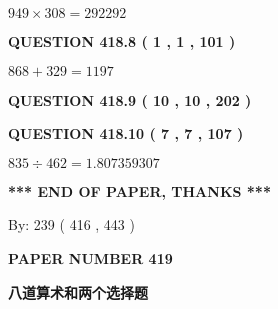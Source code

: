 \documentclass{ctexart}
\begin{document}
  
 
 

$ %
949 \times  %
308=   %
292292$
 
 
  
\vspace{0.2in}
  
{\textbf{\Large{QUESTION
418.8 
 ( 1 , 1 , 101 )
}}}
  
  
 
 

$ %
868 +  %
329=   %
1197$
 
 
  
\vspace{0.2in}
  
{\textbf{\Large{QUESTION
418.9 
 ( 10 , 10 , 202 )
}}}
  
  
  
\vspace{0.2in}
  
{\textbf{\Large{QUESTION
418.10 
 ( 7 , 7 , 107 )
}}}
  
  
 
 

$ %
835 \div  %
462=   %
1.807359307$
 
 
   
   
 \vspace{0.2in}
 
   
   
   
   
\vspace{1.0in} 
{\textbf{\large{ *** END OF PAPER, THANKS *** }}} 
   
   
\hspace{1.0in} By: 
 239 ( 416 ,  443 )
   
   
   
   
\newpage 
\setcounter{page}{ 
   419001 } 
   
   
   
   
 {\textbf{ \Large{ PAPER NUMBER  419  }}}
   
   
\vspace{0.2in}
   
   
   
   
   
   
 \vspace{0.2in}
{\LARGE {\textbf{ 八道算术和两个选择题}}}
   
   
  
\vspace{0.2in}
  
\end{document}
